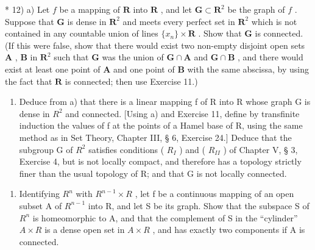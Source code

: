 * 12) a) Let \(f\) be a mapping of \(\mathbf{R}\) into \(\mathbf{R}\) , and let \(\mathbf{G} \subset \mathbf{R}^2\) be the graph of \(f\) . Suppose that \(\mathbf{G}\) is dense in \(\mathbf{R}^2\) and meets every perfect set in \(\mathbf{R}^2\) which is not contained in any countable union of lines \(\{x_n\} \times \mathbf{R}\) . Show that \(\mathbf{G}\) is connected. (If this were false, show that there would exist two non-empty disjoint open sets \(\mathbf{A}\) , \(\mathbf{B}\) in \(\mathbf{R}^2\) such that \(\mathbf{G}\) was the union of \(\mathbf{G} \cap \mathbf{A}\) and \(\mathbf{G} \cap \mathbf{B}\) , and there would exist at least one point of \(\mathbf{A}\) and one point of \(\mathbf{B}\) with the same abscissa, by using the fact that \(\mathbf{R}\) is connected; then use Exercise 11.)

\begin{enumerate}
\def\labelenumi{\alph{enumi})}
\setcounter{enumi}{1}
\tightlist
\item
  Deduce from a) that there is a linear mapping f of R into R whose graph G is dense in \(R^{2}\) and connected. {[}Using a) and Exercise 11, define by transfinite induction the values of f at the points of a Hamel base of R, using the same method as in Set Theory, Chapter III, § 6, Exercise 24.{]} Deduce that the subgroup G of \(R^{2}\) satisfies conditions ( \(R_{I}\) ) and ( \(R_{II}\) ) of Chapter V, § 3, Exercise 4, but is not locally compact, and therefore has a topology strictly finer than the usual topology of R; and that G is not locally connected.
\end{enumerate}

\begin{enumerate}
\def\labelenumi{\arabic{enumi})}
\setcounter{enumi}{12}
\tightlist
\item
  Identifying \(R^{n}\) with \(R^{n-1} \times R\) , let f be a continuous mapping of an open subset A of \(R^{n-1}\) into R, and let S be its graph. Show that the subspace S of \(R^{n}\) is homeomorphic to A, and that the complement of S in the ``cylinder'' \(A \times R\) is a dense open set in \(A \times R\) , and has exactly two components if A is connected.
\end{enumerate}

